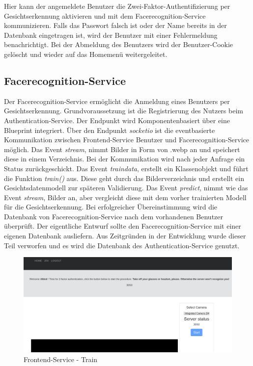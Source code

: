 Hier kann der angemeldete Benutzer die Zwei-Faktor-Authentifizierung per Gesichtserkennung aktivieren und mit dem Facerecognition-Service kommunizieren.
Falls das Passwort falsch ist oder der Name bereits in der Datenbank eingetragen ist, wird der Benutzer mit einer Fehlermeldung benachrichtigt.
Bei der Abmeldung des Benutzers wird der Benutzer-Cookie gelöscht und wieder auf das Homemenü weitergeleitet.

\subsection{Facerecognition-Service}
Der Facerecognition-Service ermöglicht die Anmeldung eines Benutzers per Gesichtserkennung.
Grundvoraussetzung ist die Registrierung des Nutzers beim Authentication-Service.
Der Endpunkt wird Komponentenbasiert über eine Blueprint integriert.
Über den Endpunkt \textit{socketio} ist die eventbasierte Kommunikation zwischen Frontend-Service Benutzer und Facerecognition-Service möglich.
Das Event \textit{stream}, nimmt Bilder in Form von .webp an und speichert diese in einem Verzeichnis.
Bei der Kommunikation wird nach jeder Anfrage ein Status zurückgeschickt.
Das Event \textit{traindata}, erstellt ein Klassenobjekt und führt die Funktion \textit{train()} aus.
Diese geht durch das Bilderverzeichnis und erstellt ein Gesichtsdatenmodell zur späteren Validierung.
Das Event \textit{predict}, nimmt wie das Event \textit{stream}, Bilder an, aber vergleicht diese mit dem vorher trainierten Modell für die Gesichtserkennung.
Bei erfolgreicher Übereinstimmung wird die Datenbank von Facerecognition-Service nach dem vorhandenen Benutzer überprüft.
Der eigentliche Entwurf sollte den Facerecognition-Service mit einer eigenen Datenbank ausliefern.
Aus Zeitgründen in der Entwicklung wurde dieser Teil verworfen und es wird die Datenbank des Authentication-Service genutzt.

\begin{figure}[!htb]
  \centering
  \includegraphics[width=1.0\columnwidth]{images/Frontend-Service-train.png}
  \caption{Frontend-Service - Train}
  \label{fig:kubevision_train}
\end{figure}

